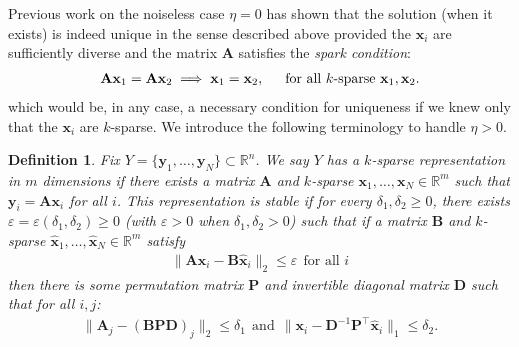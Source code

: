 \documentclass[9pt,twocolumn]{pnas-new}
\newtheorem{definition}{Definition}
\begin{document}
Previous work \cite{li2004analysis, Georgiev05, Aharon06, Hillar15} on the noiseless case $\eta = 0$ has shown that the solution (when it exists) is indeed unique in the sense described above provided the $\mathbf{x}_i$ are sufficiently diverse and the matrix $\mathbf{A}$ satisfies the \textit{spark condition}:
\begin{align}\label{SparkCondition}
\mathbf{A}\mathbf{x}_1 = \mathbf{A}\mathbf{x}_2 \implies \mathbf{x}_1 = \mathbf{x}_2,\indent \text{for all $k$-sparse } \mathbf{x}_1, \mathbf{x}_2.
\end{align}
%
which would be, in any case, a necessary condition for uniqueness if we knew only that the $\mathbf{x}_i$ are $k$-sparse. We introduce the following terminology to handle $\eta > 0$. 
\begin{definition}
Fix $Y = \{ \mathbf{y}_1, \ldots, \mathbf{y}_N\} \subset \mathbb{R}^n$. We say $Y$ has a \emph{$k$-sparse representation in $m$ dimensions} if there exists a matrix $\mathbf{A}$ and $k$-sparse $\mathbf{x}_1, \ldots, \mathbf{x}_N \in \mathbb{R}^m$ such that $\mathbf{y}_i = \mathbf{A}\mathbf{x}_i$ for all $i$. %
This representation is \emph{stable} if for every $\delta_1, \delta_2 \geq 0$, there exists $\varepsilon = \varepsilon(\delta_1, \delta_2) \geq 0$ (with $\varepsilon > 0$ when  $\delta_1, \delta_2 > 0$) such that if a matrix $\mathbf{B}$ and $k$-sparse $\mathbf{\hat x}_1, \ldots, \mathbf{\hat x}_N \in \mathbb{R}^m$ satisfy
\begin{align*}
\|\mathbf{A}\mathbf{x}_i - \mathbf{B}\mathbf{\hat x}_i\|_2 \leq \varepsilon \ \ \text{for all $i$}
\end{align*}
%
then there is some permutation matrix $\mathbf{P}$ and invertible diagonal matrix $\mathbf{D}$ such that for all $i, j$:
\begin{align}\label{def1}
\|\mathbf{A}_j - (\mathbf{BPD})_j\|_2 \leq \delta_1 \ \ \text{and} \ \ \|\mathbf{x}_i - \mathbf{D}^{-1}\mathbf{P}^{\top}\mathbf{\hat x}_i\|_1 \leq \delta_2.
\end{align}
\end{definition}
\end{document}

